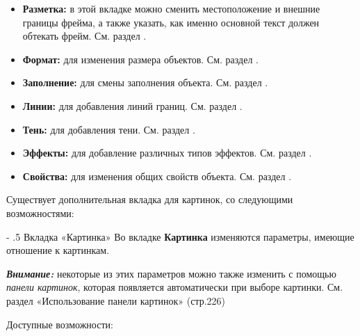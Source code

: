﻿\documentclass[a4paper,10pt]{article}
\makeatletter
\renewcommand\paragraph{%
   \@startsection{paragraph}{4}{0mm}%
      {-\baselineskip}%
      {.5\baselineskip}%
      {\normalfont\normalsize\bfseries}}
\makeatother
\begin{document}
\begin{itemize}
 \item \textbf{Разметка:} в этой вкладке можно сменить местоположение и внешние границы фрейма, а также указать, как именно основной текст должен обтекать фрейм. См. раздел .
 \item \textbf{Формат:} для изменения размера объектов. См. раздел .
 \item \textbf{Заполнение:} для смены заполнения объекта. См. раздел .
 \item \textbf{Линии:} для добавления линий границ. См. раздел .
 \item \textbf{Тень:} для добавления тени. См. раздел .
 \item \textbf{Эффекты:} для добавление различных типов эффектов. См. раздел .
 \item \textbf{Свойства:} для изменения общих свойств объекта. См. раздел .
\end{itemize}

Существует дополнительная вкладка для картинок, со следующими возможностями:

\paragraph{Вкладка «Картинка»}
Во вкладке \textbf{Картинка} изменяются параметры, имеющие отношение к картинкам.

\begin{mdframed}[backgroundcolor=blue!10]
\textbf{\textit{Внимание:}} некоторые из этих параметров можно также изменить с помощью \textit{панели картинок}, которая появляется автоматически при выборе картинки. См. раздел «Использование панели картинок» (стр.226)
\end{mdframed}

Доступные возможности:
\end{document}
